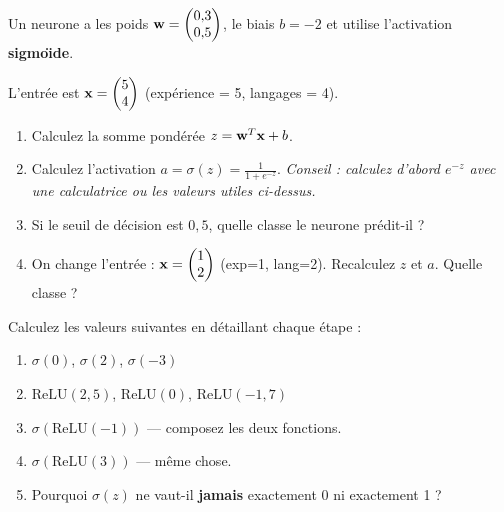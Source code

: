 Un neurone a les poids $\mathbf{w} = \begin{pmatrix} 0{,}3 \\ 0{,}5 \end{pmatrix}$,
le biais $b = -2$ et utilise l'activation \textbf{sigmo\"{\i}de}.

L'entr\'{e}e est $\mathbf{x} = \begin{pmatrix} 5 \\ 4 \end{pmatrix}$
(exp\'{e}rience = 5, langages = 4).

\begin{enumerate}[label=\alph*)]
    \item Calculez la somme pond\'{e}r\'{e}e $z = \mathbf{w}^T\mathbf{x} + b$.
    \item Calculez l'activation $a = \sigma(z) = \frac{1}{1 + e^{-z}}$.
        \emph{Conseil : calculez d'abord $e^{-z}$ avec une calculatrice ou les valeurs utiles ci-dessus.}
    \item Si le seuil de d\'{e}cision est $0{,}5$, quelle classe le neurone pr\'{e}dit-il ?
    \item On change l'entr\'{e}e : $\mathbf{x} = \begin{pmatrix} 1 \\ 2 \end{pmatrix}$
        (exp=1, lang=2). Recalculez $z$ et $a$. Quelle classe ?
\end{enumerate}


Calculez les valeurs suivantes en d\'{e}taillant chaque \'{e}tape :

\begin{enumerate}[label=\alph*)]
    \item $\sigma(0)$, $\sigma(2)$, $\sigma(-3)$
    \item $\text{ReLU}(2{,}5)$, $\text{ReLU}(0)$, $\text{ReLU}(-1{,}7)$
    \item $\sigma(\text{ReLU}(-1))$ --- composez les deux fonctions.
    \item $\sigma(\text{ReLU}(3))$ --- m\^{e}me chose.
    \item Pourquoi $\sigma(z)$ ne vaut-il \textbf{jamais} exactement 0 ni exactement 1 ?
\end{enumerate}


